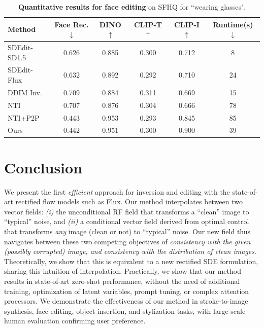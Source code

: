 \documentclass{article} %
\theoremstyle{plain}
\begin{document}
\begin{table}[!t]
\vspace{-2ex}
\centering
\caption{
\textbf{Quantitative results for face editing} on SFHQ for ``wearing glasses".
}
\label{tab:sfhq}
\small
\begin{tabular}{lccccc}
\toprule
\textbf{Method} & \textbf{Face Rec.} $\downarrow$ & \textbf{DINO} $\uparrow$ & \textbf{CLIP-T} $\uparrow$ & \textbf{CLIP-I} $\uparrow$ & \textbf{Runtime(s)} $\downarrow$\\ 
\midrule
SDEdit-SD1.5 & 0.626 & 0.885 & 0.300  & 0.712 & 8\\ 
SDEdit-Flux & 0.632 & 0.892 & 0.292 & 0.710 & 24\\ 
DDIM Inv. & 0.709 & 0.884 & 0.311 & 0.669 & 15\\ 
\rowcolor{gray!10}
NTI & 0.707 & 0.876 & 0.304 & 0.666 & 78\\ 
\rowcolor{gray!10}
NTI+P2P & 0.443 & 0.953 & 0.293 & 0.845 & 85\\ 
\rowcolor{orange!25}
Ours & {0.442} & {0.951}  & 0.300  & 0.900 & 39\\ 
\bottomrule
\end{tabular}
\vspace{-3ex}
\end{table}




\section{Conclusion}
\label{sec:conc}
\vspace{-1ex}
We present the first \textit{efficient} approach for inversion and editing with the state-of-art rectified flow models such as Flux. Our method interpolates between two vector fields: {\em (i)} the unconditional RF field that transforms a ``clean'' image to  ``typical'' noise, and {\em (ii)} a conditional vector field derived from optimal control that transforms {\em any} image (clean or not) to ``typical'' noise. Our new field thus navigates between these two competing objectives of {\em consistency with the given (possibly corrupted) image, and consistency with the distribution of clean images}. Theoretically, we show that this is equivalent to a new rectified SDE formulation, sharing this intuition of interpolation. Practically, we show that our method results in state-of-art zero-shot performance, without the need of additional training, optimization of latent variables,  prompt tuning, or complex attention processors.
We demonstrate the effectiveness of our method in stroke-to-image synthesis, face editing, object insertion, and stylization tasks, with large-scale human evaluation confirming user preference.
\end{document}
